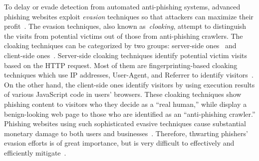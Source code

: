 To delay or evade detection from automated anti-phishing systems, advanced phishing websites exploit \emph{evasion} techniques so that attackers can maximize their profit~\cite{thomas2017data}.
The evasion techniques, also known as~\emph{cloaking}, 
attempt to distinguish the visits from potential victims out of those from anti-phishing crawlers.
The cloaking techniques can be categorized by two groups: server-side ones~\cite{oest2018inside} and client-side ones~\cite{zhang2021crawlphish}.
Server-side cloaking techniques identify potential victim visits based on the HTTP request.
Most of them are fingerprinting-based cloaking techniques which use IP addresses, User-Agent, and Referrer to identify visitors~\cite{oest2018inside}.
On the other hand, the client-side ones identify visitors by using execution results of various JavaScript code in users' browsers.
These cloaking techniques show phishing content to visitors who they decide as a ``real human,'' while display a benign-looking web page to those who are identified as an ``anti-phishing crawler.''
Phishing websites using such sophisticated evasive techniques cause substantial monetary damage to both users and businesses~\cite{oest2020sunrise}.
Therefore, thwarting phishers' evasion efforts is of great importance, but is very difficult to effectively and efficiently mitigate~\cite{oest2020sunrise, zhang2021crawlphish}.

